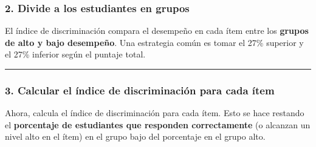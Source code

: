 \documentclass[
]{article}
\newenvironment{Shaded}{\begin{snugshade}}{\end{snugshade}}
\newcommand{\AttributeTok}[1]{\textcolor[rgb]{0.13,0.29,0.53}{#1}}
\newcommand{\CommentTok}[1]{\textcolor[rgb]{0.56,0.35,0.01}{\textit{#1}}}
\newcommand{\ConstantTok}[1]{\textcolor[rgb]{0.56,0.35,0.01}{#1}}
\newcommand{\DecValTok}[1]{\textcolor[rgb]{0.00,0.00,0.81}{#1}}
\newcommand{\FloatTok}[1]{\textcolor[rgb]{0.00,0.00,0.81}{#1}}
\newcommand{\FunctionTok}[1]{\textcolor[rgb]{0.13,0.29,0.53}{\textbf{#1}}}
\newcommand{\NormalTok}[1]{#1}
\newcommand{\OtherTok}[1]{\textcolor[rgb]{0.56,0.35,0.01}{#1}}
\newcommand{\SpecialCharTok}[1]{\textcolor[rgb]{0.81,0.36,0.00}{\textbf{#1}}}
\begin{document}
\subsubsection{\texorpdfstring{\textbf{2. Divide a los estudiantes en
grupos}}{2. Divide a los estudiantes en grupos}}\label{divide-a-los-estudiantes-en-grupos}

El índice de discriminación compara el desempeño en cada ítem entre los
\textbf{grupos de alto y bajo desempeño}. Una estrategia común es tomar
el 27\% superior y el 27\% inferior según el puntaje total.

\begin{Shaded}
\end{Shaded}

\begin{center}\rule{0.5\linewidth}{0.5pt}\end{center}

\subsubsection{\texorpdfstring{\textbf{3. Calcular el índice de
discriminación para cada
ítem}}{3. Calcular el índice de discriminación para cada ítem}}\label{calcular-el-uxedndice-de-discriminaciuxf3n-para-cada-uxedtem}

Ahora, calcula el índice de discriminación para cada ítem. Esto se hace
restando el \textbf{porcentaje de estudiantes que responden
correctamente} (o alcanzan un nivel alto en el ítem) en el grupo bajo
del porcentaje en el grupo alto.
\end{document}
